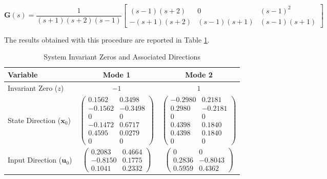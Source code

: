 \documentclass{scrreprt}
\begin{document}
\begin{equation}
    \boldsymbol{G}(s) = \frac{1}{(s+1)(s+2)(s-1)} 
    \begin{bmatrix}
        (s-1)(s+2) & 0 & (s-1)^2 \\
        -(s+1)(s+2) & (s-1)(s+1) & (s-1)(s+1)
    \end{bmatrix}
\end{equation}

The results obtained with this procedure are reported in Table \ref{tab:invariant_zeros_nonsquare}.

\begin{table}[h]
    \centering
    \caption{System Invariant Zeros and Associated Directions}
    \label{tab:invariant_zeros_nonsquare}
    \renewcommand{\arraystretch}{1.5}
    \begin{tabular}{lcc}
        \toprule
        \textbf{Variable} & \textbf{Mode 1} & \textbf{Mode 2} \\ 
        \midrule
        Invariant Zero ($z$) & $-1$ & $1$ \\ 
        \midrule
        State Direction ($\boldsymbol{x}_0$) & 
        $\begin{pmatrix} 0.1562 & 0.3498 \\ -0.1562 & -0.3498 \\ 0 & 0 \\ -0.1472 & 0.6717\\ 0.4595 & 0.0279 \\ 0 & 0 \end{pmatrix}$ & 
        $\begin{pmatrix} -0.2980 & 0.2181 \\ 0.2980 & -0.2181 \\ 0 & 0 \\ 0.4398 & 0.1840 \\ 0.4398 & 0.1840 \\ 0 & 0 \end{pmatrix}$ \\ 
        \midrule
        Input Direction ($\boldsymbol{u}_0$) & 
        $\begin{pmatrix} 0.2083 & 0.4664 \\ -0.8150 & 0.1775 \\ 0.1041 & 0.2332 \end{pmatrix}$ & 
        $\begin{pmatrix} 0 & 0 \\ 0.2836 & -0.8043 \\ 0.5959 & 0.4362 \end{pmatrix}$ \\ 
        \bottomrule
    \end{tabular}


\end{table}
\end{document}
